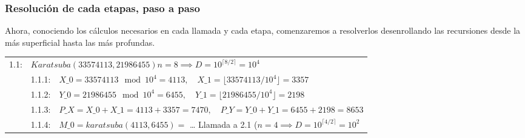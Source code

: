 \documentclass[titlepage,a4paper]{article}
\begin{document}
\newpage\subsubsection{Resolución de cada etapas, paso a paso}

Ahora, conociendo los cálculos necesarios en cada llamada y cada etapa, comenzaremos a resolverlos 
desenrollando las recursiones desde la más superficial hasta las más profundas.
\par
\vspace{3em}
\par
\begin{longtable}[r]{lllllll}

1.1: & \multicolumn{6}{l}{ $ Karatsuba(33574113, 21986455) n=8 \implies D = 10^{\lceil 8/2\rceil} = 10^4$ }\\
     & 1.1.1:     & \multicolumn{5}{l}{$X\_0 = 33574113 \mod 10^4 = 4113, \quad X\_1 = \lfloor 33574113 / 10^4 \rfloor = 3357$}     \\
     & 1.1.2:     & \multicolumn{5}{l}{$Y\_0 = 21986455 \mod 10^4 = 6455, \quad Y\_1 = \lfloor 21986455 / 10^4 \rfloor = 2198$}     \\
     & 1.1.3:     & \multicolumn{5}{l}{$P\_X = X\_0+X\_1 = 4113 + 3357 = 7470,\quad P\_Y = Y\_0+Y\_1 = 6455 + 2198 = 8653$}     \\
     & 1.1.4:     & \multicolumn{5}{l}{$M\_0=karatsuba(4113,6455)=$ … Llamada a 2.1 ($n=4 \implies D=10^{\lceil 4/2\rceil} = 10^2$}     \\


\end{longtable}
\end{document}
